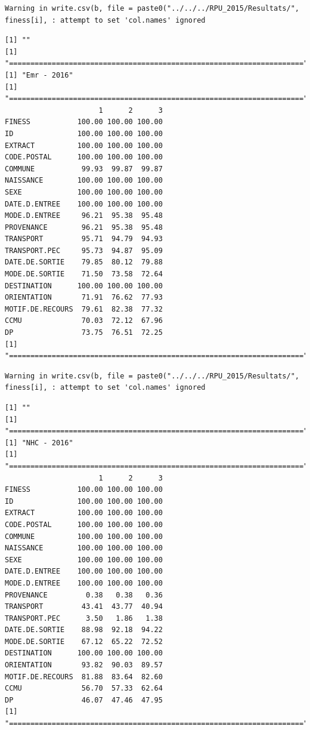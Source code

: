 \documentclass[]{article}
\begin{document}
\begin{verbatim}
Warning in write.csv(b, file = paste0("../../../RPU_2015/Resultats/",
finess[i], : attempt to set 'col.names' ignored
\end{verbatim}

\begin{verbatim}
[1] ""
[1] "====================================================================="
[1] "Emr - 2016"
[1] "====================================================================="
                      1      2      3
FINESS           100.00 100.00 100.00
ID               100.00 100.00 100.00
EXTRACT          100.00 100.00 100.00
CODE.POSTAL      100.00 100.00 100.00
COMMUNE           99.93  99.87  99.87
NAISSANCE        100.00 100.00 100.00
SEXE             100.00 100.00 100.00
DATE.D.ENTREE    100.00 100.00 100.00
MODE.D.ENTREE     96.21  95.38  95.48
PROVENANCE        96.21  95.38  95.48
TRANSPORT         95.71  94.79  94.93
TRANSPORT.PEC     95.73  94.87  95.09
DATE.DE.SORTIE    79.85  80.12  79.88
MODE.DE.SORTIE    71.50  73.58  72.64
DESTINATION      100.00 100.00 100.00
ORIENTATION       71.91  76.62  77.93
MOTIF.DE.RECOURS  79.61  82.38  77.32
CCMU              70.03  72.12  67.96
DP                73.75  76.51  72.25
[1] "====================================================================="
\end{verbatim}

\begin{verbatim}
Warning in write.csv(b, file = paste0("../../../RPU_2015/Resultats/",
finess[i], : attempt to set 'col.names' ignored
\end{verbatim}

\begin{verbatim}
[1] ""
[1] "====================================================================="
[1] "NHC - 2016"
[1] "====================================================================="
                      1      2      3
FINESS           100.00 100.00 100.00
ID               100.00 100.00 100.00
EXTRACT          100.00 100.00 100.00
CODE.POSTAL      100.00 100.00 100.00
COMMUNE          100.00 100.00 100.00
NAISSANCE        100.00 100.00 100.00
SEXE             100.00 100.00 100.00
DATE.D.ENTREE    100.00 100.00 100.00
MODE.D.ENTREE    100.00 100.00 100.00
PROVENANCE         0.38   0.38   0.36
TRANSPORT         43.41  43.77  40.94
TRANSPORT.PEC      3.50   1.86   1.38
DATE.DE.SORTIE    88.98  92.18  94.22
MODE.DE.SORTIE    67.12  65.22  72.52
DESTINATION      100.00 100.00 100.00
ORIENTATION       93.82  90.03  89.57
MOTIF.DE.RECOURS  81.88  83.64  82.60
CCMU              56.70  57.33  62.64
DP                46.07  47.46  47.95
[1] "====================================================================="
\end{verbatim}
\end{document}
